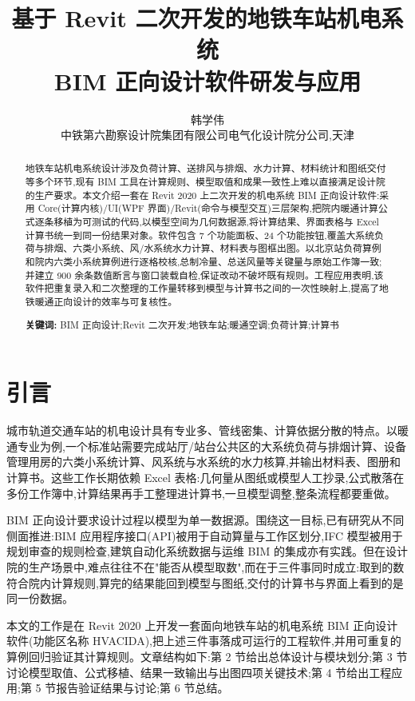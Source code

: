 \documentclass[UTF8,a4paper,zihao=-4]{ctexart}
\title{\heiti 基于 Revit 二次开发的地铁车站机电系统\\BIM 正向设计软件研发与应用}
\author{韩学伟\\[2pt] \small 中铁第六勘察设计院集团有限公司电气化设计院分公司,天津}
\date{}
\begin{document}
\maketitle

\begin{abstract}
\noindent
地铁车站机电系统设计涉及负荷计算、送排风与排烟、水力计算、材料统计和图纸交付等多个环节,现有 BIM 工具在计算规则、模型取值和成果一致性上难以直接满足设计院的生产要求。本文介绍一套在 Revit 2020 上二次开发的机电系统 BIM 正向设计软件:采用 Core(计算内核)/UI(WPF 界面)/Revit(命令与模型交互)三层架构,把院内暖通计算公式逐条移植为可测试的代码,以模型空间为几何数据源,将计算结果、界面表格与 Excel 计算书统一到同一份结果对象。软件包含 7 个功能面板、24 个功能按钮,覆盖大系统负荷与排烟、六类小系统、风/水系统水力计算、材料表与图框出图。以北京站负荷算例和院内六类小系统算例进行逐格校核,总制冷量、总送风量等关键量与原始工作簿一致;并建立 900 余条数值断言与窗口装载自检,保证改动不破坏既有规则。工程应用表明,该软件把重复录入和二次整理的工作量转移到模型与计算书之间的一次性映射上,提高了地铁暖通正向设计的效率与可复核性。
\vspace{0.5em}

\noindent\textbf{关键词:} BIM 正向设计;Revit 二次开发;地铁车站;暖通空调;负荷计算;计算书
\end{abstract}

\section{引言}

城市轨道交通车站的机电设计具有专业多、管线密集、计算依据分散的特点。以暖通专业为例,一个标准站需要完成站厅/站台公共区的大系统负荷与排烟计算、设备管理用房的六类小系统计算、风系统与水系统的水力核算,并输出材料表、图册和计算书。这些工作长期依赖 Excel 表格:几何量从图纸或模型人工抄录,公式散落在多份工作簿中,计算结果再手工整理进计算书,一旦模型调整,整条流程都要重做。

BIM 正向设计要求设计过程以模型为单一数据源。围绕这一目标,已有研究从不同侧面推进:BIM 应用程序接口(API)被用于自动算量与工作区划分\cite{taghaddos2019},IFC 模型被用于规划审查的规则检查\cite{noardo2020},建筑自动化系统数据与运维 BIM 的集成亦有实践\cite{quinn2022}。但在设计院的生产场景中,难点往往不在"能否从模型取数",而在于三件事同时成立:取到的数符合院内计算规则,算完的结果能回到模型与图纸,交付的计算书与界面上看到的是同一份数据。

本文的工作是在 Revit 2020 上开发一套面向地铁车站的机电系统 BIM 正向设计软件(功能区名称 HVACIDA),把上述三件事落成可运行的工程软件,并用可重复的算例回归验证其计算规则。文章结构如下:第 2 节给出总体设计与模块划分;第 3 节讨论模型取值、公式移植、结果一致输出与出图四项关键技术;第 4 节给出工程应用;第 5 节报告验证结果与讨论;第 6 节总结。
\end{document}
